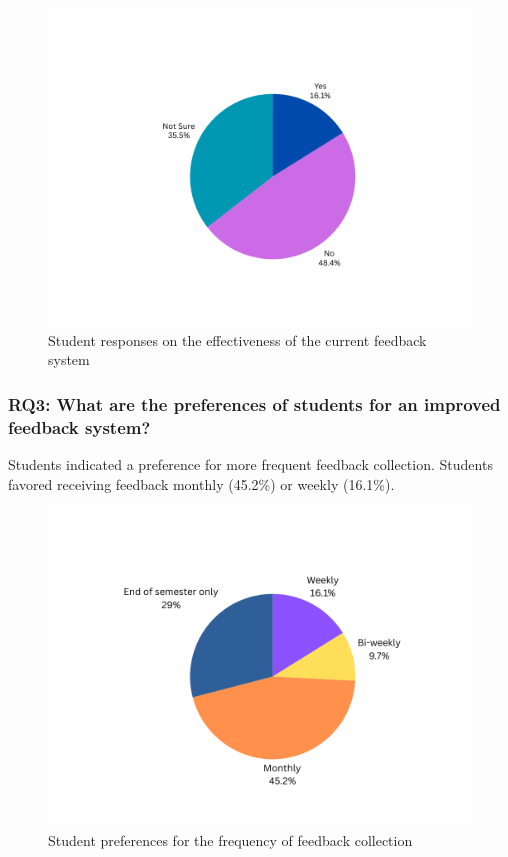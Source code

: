 \documentclass[conference]{IEEEtran}
\begin{document}
\begin{figure}[htbp]
    \centering
    \includegraphics[width=0.8\linewidth]{feedback_action.png} 
    \caption{Student responses on the effectiveness of the current feedback system}
    \label{fig:feedback_action}
\end{figure}


\subsubsection{RQ3: What are the preferences of students for an improved feedback system?}
Students indicated a preference for more frequent feedback collection. Students favored receiving feedback monthly (45.2\%) or weekly (16.1\%).

\begin{figure}[htbp]
    \centering
    \includegraphics[width=0.8\linewidth]{feedback_report.png} 
    \caption{Student preferences for the frequency of feedback collection}
    \label{fig:feedback_report}
\end{figure}
\end{document}
